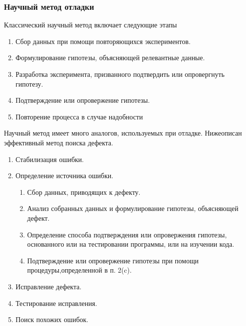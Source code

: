 \documentclass[a4paper]{article}
\begin{document}
\subsubsection{Научный метод отладки}

Классический  научный  метод  включает  следующие  этапы
\begin{enumerate}
  \item Сбор  данных  при  помощи  повторяющихся  экспериментов.
  \item Формулирование  гипотезы,  объясняющей  релевантные  данные.
  \item Разработка  эксперимента,  призванного  подтвердить  или  опровергнуть  гипотезу.
  \item Подтверждение  или  опровержение  гипотезы.
  \item Повторение  процесса  в  случае  надобности
\end{enumerate}

Научный  метод  имеет  много  аналогов,  используемых  при  отладке.  Нижеописан  эффективный  метод  поиска  дефекта.

\begin{enumerate}
  \item Стабилизация  ошибки.
  \item Определение  источника  ошибки.
        \begin{enumerate}
          \item Сбор  данных,  приводящих  к  дефекту.
          \item Анализ собранных данных и формулирование гипотезы, объясняющей дефект.
          \item Определение  способа  подтверждения  или  опровержения  гипотезы,  основанного  или  на  тестировании  программы,  или  на  изучении  кода.
          \item Подтверждение  или  опровержение  гипотезы  при  помощи  процедуры,определенной  в  п. 2(c).
        \end{enumerate}
  \item Исправление  дефекта.
  \item Тестирование  исправления.
  \item Поиск  похожих  ошибок.
\end{enumerate}
\end{document}
